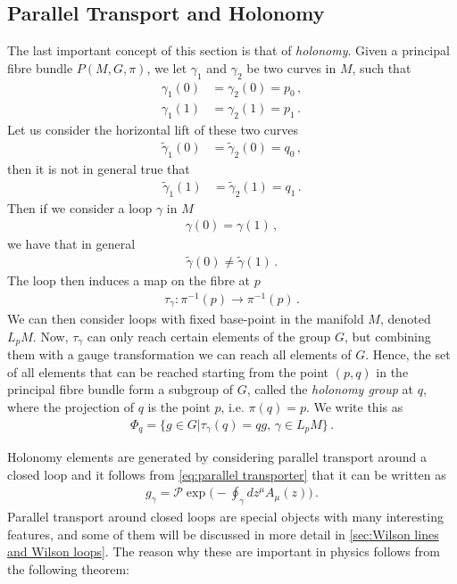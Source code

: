 \subsection*{Parallel Transport and Holonomy}
The last important concept of this section is that of \emph{holonomy}. Given a principal fibre bundle $P(M,G,\pi)$, we let $\gamma_1$ and $\gamma_2$ be two curves in $M$, such that
\begin{align}
    \gamma_{1}(0)&=\gamma_{2}(0)=p_{0}\,,
    \\
    \gamma_{1}(1)&=\gamma_{2}(1)=p_{1}\,.
\end{align}
Let us consider the horizontal lift of these two curves
\begin{align}
    \tilde{\gamma}_{1}(0)&=\tilde{\gamma}_{2}(0)=q_{0}\,,
\end{align}
then it is not in general true that
\begin{align}
    \tilde{\gamma}_{1}(1)&=\tilde{\gamma}_{2}(1)=q_{1}\,.
\end{align}
Then if we consider a loop $\gamma$ in $M$
\begin{align}
    \gamma(0)=\gamma(1)\,,
\end{align}
we have that in general
\begin{align}
    \tilde{\gamma}(0)\neq\tilde{\gamma}(1)\,.
\end{align}
The loop then induces a map on the fibre at $p$
\begin{align}
    \tau_{\gamma}:\pi^{-1}(p)\rightarrow \pi^{-1}(p)\,.
\end{align}
We can then consider loops with fixed base-point in the manifold $M$, denoted $L_{p}M$. Now, $\tau_{\gamma}$ can only reach certain elements of the group $G$, but combining them with a gauge transformation we can reach all elements of $G$. Hence, the set of all elements that can be reached starting from the point $(p,q)$ in the principal fibre bundle form a subgroup of $G$, called the \emph{holonomy group} at $q$, where the projection of $q$ is the point $p$, i.e. $\pi(q)=p$. We write this as
\begin{align}
    \Phi_{q}=\big\{g\in G|\tau_{\gamma}(q)=qg,\,\gamma\in L_{p}M\big\}\,.
\end{align}

Holonomy elements are generated by considering parallel transport around a closed loop and it follows from \cref{eq:parallel transporter} that it can be written as
\begin{align}
    g_{\gamma}=\mathcal{P}\exp\big(-\oint_{\gamma}dz^{\mu}A_{\mu}(z)\big)\,.
\end{align}
Parallel transport around closed loops are special objects with many interesting features, and some of them will be discussed in more detail in \cref{sec:Wilson lines and Wilson loops}. The reason why these are important in physics follows from the following theorem:


